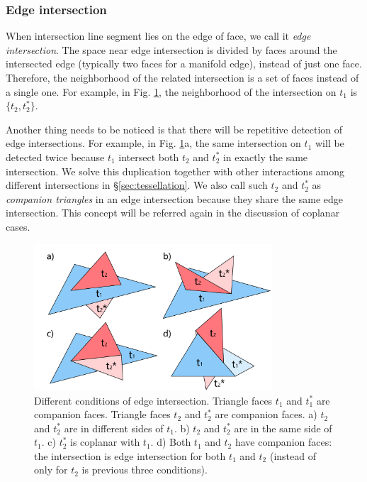 \documentclass[10pt,journal,compsoc]{IEEEtran}
\begin{document}
\subsubsection{Edge intersection}


When intersection line segment lies on the edge of face, we call it \emph{edge intersection}. The space near edge intersection is divided by faces around the intersected edge (typically two faces for a manifold edge), instead of just one face. Therefore, the neighborhood of the related intersection is a set of faces instead of a single one. For example, in Fig. \ref{fig:twin}, the neighborhood of the intersection on $t_1$ is $\{t_2, t^*_2\}$.

Another thing needs to be noticed is that there will be repetitive detection of edge intersections. For example, in Fig. \ref{fig:twin}a, the same intersection on $t_1$ will be detected twice because $t_1$ intersect both $t_2$ and $t_2^*$ in exactly the same intersection. We solve this duplication together with other interactions among different intersections in \S\ref{sec:tessellation}. We also call such $t_2$ and $t_2^*$ as \emph{companion triangles} in an edge intersection because they share the same edge intersection. This concept will be referred again in the discussion of coplanar cases.

\begin{figure}[t]
\centering
\includegraphics[width=3.5in]{edgeisect}
\caption{Different conditions of edge intersection. Triangle faces $t_1$ and $t_1^*$ are companion faces. Triangle faces $t_2$ and $t_2^*$ are companion faces. a) $t_2$ and $t_2^*$ are in different sides of $t_1$. b) $t_2$ and $t_2^*$ are in the same side of $t_1$. c) $t_2^*$ is coplanar with $t_1$. d) Both $t_1$ and $t_2$ have companion faces: the intersection is edge intersection for both $t_1$ and $t_2$ (instead of only for $t_2$ is previous three conditions). }
\label{fig:twin}
\end{figure}
\end{document}
